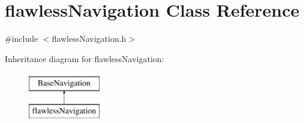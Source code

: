 \hypertarget{classflawless_navigation}{}\section{flawless\+Navigation Class Reference}
\label{classflawless_navigation}


{\ttfamily \#include $<$flawless\+Navigation.\+h$>$}

Inheritance diagram for flawless\+Navigation\+:\begin{figure}[H]
\begin{center}
\leavevmode
\includegraphics[height=2.000000cm]{classflawless_navigation}
\end{center}
\end{figure}
